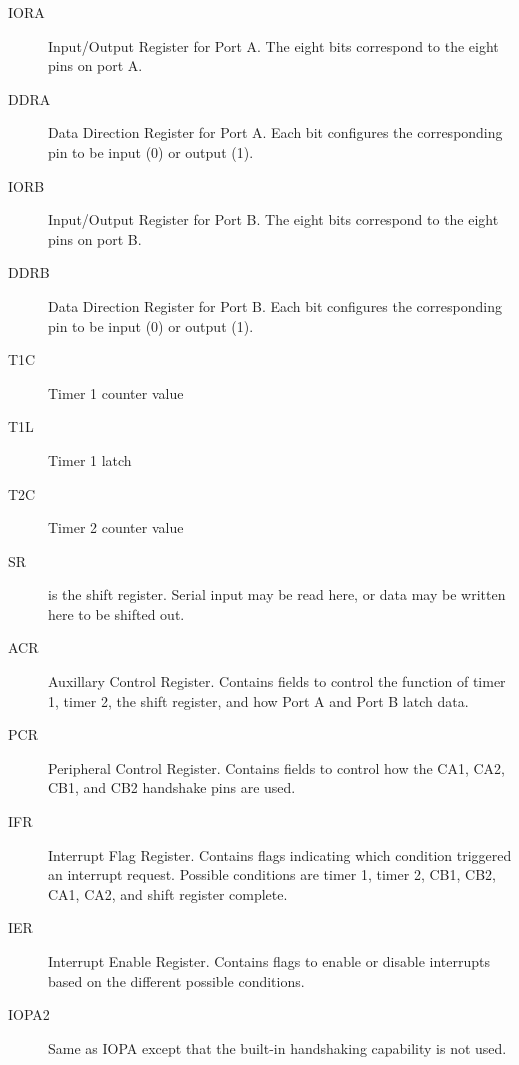 \begin{description}
    \item[IORA] Input/Output Register for Port A. The eight bits correspond to the eight pins on port A.

    \item[DDRA] Data Direction Register for Port A. Each bit configures the corresponding pin to be input (0) or output (1).

    \item[IORB] Input/Output Register for Port B. The eight bits correspond to the eight pins on port B.

    \item[DDRB] Data Direction Register for Port B. Each bit configures the corresponding pin to be input (0) or output (1).

    \item[T1C] Timer 1 counter value

    \item[T1L] Timer 1 latch

    \item[T2C] Timer 2 counter value

    \item[SR] is the shift register. Serial input may be read here, or data may be written here to be shifted out.

    \item[ACR] Auxillary Control Register. Contains fields to control the function of timer 1, timer 2, the shift register, and how Port A and Port B latch data.

    \item[PCR] Peripheral Control Register. Contains fields to control how the CA1, CA2, CB1, and CB2 handshake pins are used.

    \item[IFR] Interrupt Flag Register. Contains flags indicating which condition triggered an interrupt request. Possible conditions are timer 1, timer 2, CB1, CB2, CA1, CA2, and shift register complete.

    \item[IER] Interrupt Enable Register. Contains flags to enable or disable interrupts based on the different possible conditions.

    \item[IOPA2] Same as IOPA except that the built-in handshaking capability is not used.

\end{description}

